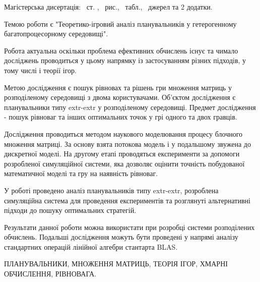 
Магістерська дисертація: \pageref*{MyLastPage}~ст. , \totfig~рис.,  \tottab~табл., ~джерел та 2 додатки.

Темою роботи є "Теоретико-ігровий аналіз планувальників у гетерогенному багатопроцесорному середовищі".

Робота актуальна оскільки проблема ефективних обчислень існує та чимало досліджень проводиться у цьому напрямку із застосуванням різних підходів, у тому числі і теорії ігор.

Метою дослідження є пошук рівновах та рішень гри множення матриць у розподіленому середовищі з двома користувачами. Об'єктом дослідження є планувальники типу extr-extr у розподіленому середовищі. Предмет дослідження - пошук рівноваг та інших оптимальних точок у грі одного та двох гравців.

Дослідження проводиться методом наукового моделювання процесу блочного множення матриці. За основу взята потокова модель і у подальшому звужена до дискретної моделі. На другому етапі проводяться експерименти за допомоги розробленої симуляційної системи, яка дозволяє оцінити точність побудованої математичної моделі та гру на наявність рівноваг.

У роботі проведено аналіз планувальників типу extr-extr, розроблена симуляційна система для проведення експериментів та розглянуті альтернативні підходи до пошуку оптимальних стратегій.

Результати данної роботи можна використати при розробці системи розподілених обчислень. Подальші дослідження можуть бути проведені у напрямі аналізу стандартних операцій лінійної алгебри стантарта BLAS.

\MakeUppercase{планувальники, множення матриць, теорія ігор, хмарні обчислення, рівновага.}